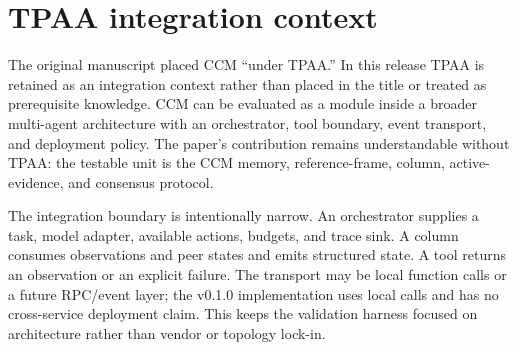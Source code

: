 \section{TPAA integration context}

The original manuscript placed CCM ``under TPAA.'' In this release TPAA is retained as an integration context rather than placed in the title or treated as prerequisite knowledge. CCM can be evaluated as a module inside a broader multi-agent architecture with an orchestrator, tool boundary, event transport, and deployment policy. The paper's contribution remains understandable without TPAA: the testable unit is the CCM memory, reference-frame, column, active-evidence, and consensus protocol.

The integration boundary is intentionally narrow. An orchestrator supplies a task, model adapter, available actions, budgets, and trace sink. A column consumes observations and peer states and emits structured state. A tool returns an observation or an explicit failure. The transport may be local function calls or a future RPC/event layer; the v0.1.0 implementation uses local calls and has no cross-service deployment claim. This keeps the validation harness focused on architecture rather than vendor or topology lock-in.
